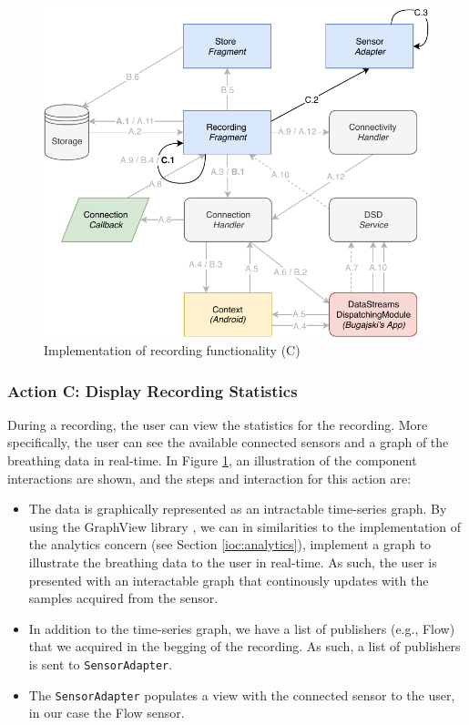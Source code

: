 \begin{figure}[!h]
    \centering
    \includegraphics[scale=0.7]{images/Recording_ImpC.pdf}
    \caption{Implementation of recording functionality (C)}
    \label{fig:impl_recordingC}
\end{figure}


\subsubsection{Action C: Display Recording Statistics}
During a recording, the user can view the statistics for the recording. More specifically, the user can see the available connected sensors and a graph of the breathing data in real-time. In Figure \ref{fig:impl_recordingC}, an illustration of the component interactions are shown, and the steps and interaction for this action are: 


\begin{itemize}
    \item[C.1] The data is graphically represented as an intractable time-series graph. By using the GraphView library \cite{androidgraph}, we can in similarities to the implementation of the analytics concern (see Section \ref{ioc:analytics}), implement a graph to illustrate the breathing data to the user in real-time. As such, the user is presented with an interactable graph that continously updates with the samples acquired from the sensor.
    \item[C.2] In addition to the time-series graph, we have a list of publishers (e.g., Flow) that we acquired in the begging of the recording. As such, a list of publishers is sent to \verb|SensorAdapter|. 
    \item[C.3] The \verb|SensorAdapter| populates a view with the connected sensor to the user, in our case the Flow sensor. 
\end{itemize}


